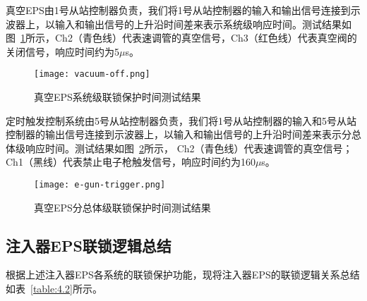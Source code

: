 真空EPS由1号从站控制器负责，我们将1号从站控制器的输入和输出信号连接到示波器上，以输入和输出信号的上升沿时间差来表示系统级响应时间。测试结果如图~\ref{fig:vacuum-off}所示，Ch2（青色线）代表速调管的真空信号，Ch3（红色线）代表真空阀的关闭信号，响应时间约为5$\mu$s。

\begin{figure}[!htb]
	\centering
	\texttt{[image: vacuum-off.png]}
	\caption{真空EPS系统级联锁保护时间测试结果}
	\label{fig:vacuum-off}
\end{figure}

定时触发控制系统由5号从站控制器负责，我们将1号从站控制器的输入和5号从站控制器的输出信号连接到示波器上，以输入和输出信号的上升沿时间差来表示分总体级响应时间。测试结果如图~\ref{fig:e-gun-trigger}所示， Ch2（青色线）代表速调管的真空信号； Ch1（黑线）代表禁止电子枪触发信号，响应时间约为160$\mu$s。

\begin{figure}[!htb]
	\centering
	\texttt{[image: e-gun-trigger.png]}
	\caption{真空EPS分总体级联锁保护时间测试结果}
	\label{fig:e-gun-trigger}
\end{figure}

\subsection{注入器EPS联锁逻辑总结}

根据上述注入器EPS各系统的联锁保护功能，现将注入器EPS的联锁逻辑关系总结如表~\ref{table:4.2}所示。


